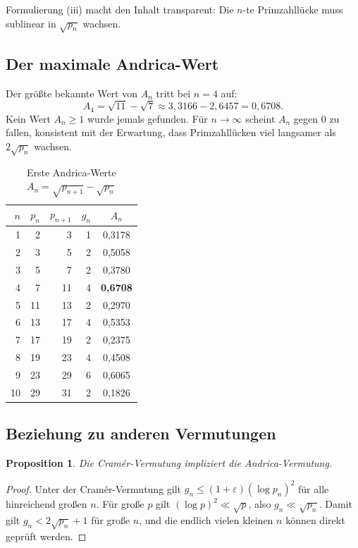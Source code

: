 \documentclass[12pt,a4paper]{amsart}
\newtheorem{proposition}[theorem]{Proposition}
\theoremstyle{definition}
\begin{document}
Formulierung (iii) macht den Inhalt transparent: Die $n$-te Primzahll\"{u}cke muss
sublinear in $\sqrt{p_n}$ wachsen.

\subsection{Der maximale Andrica-Wert}

Der gr\"{o}\ss{}te bekannte Wert von $A_n$ tritt bei $n = 4$ auf:
\[
  A_4 = \sqrt{11} - \sqrt{7} \approx 3{,}3166 - 2{,}6457 = 0{,}6708.
\]
Kein Wert $A_n \geq 1$ wurde jemals gefunden. F\"{u}r $n \to \infty$ scheint
$A_n$ gegen $0$ zu fallen, konsistent mit der Erwartung, dass Primzahll\"{u}cken
viel langsamer als $2\sqrt{p_n}$ wachsen.

\begin{table}[h]
\centering
\caption{Erste Andrica-Werte $A_n = \sqrt{p_{n+1}} - \sqrt{p_n}$}
\begin{tabular}{@{}rrrrc@{}}
\toprule
$n$ & $p_n$ & $p_{n+1}$ & $g_n$ & $A_n$ \\
\midrule
1 & 2 & 3 & 1 & 0{,}3178 \\
2 & 3 & 5 & 2 & 0{,}5058 \\
3 & 5 & 7 & 2 & 0{,}3780 \\
4 & 7 & 11 & 4 & \textbf{0{,}6708} \\
5 & 11 & 13 & 2 & 0{,}2970 \\
6 & 13 & 17 & 4 & 0{,}5353 \\
7 & 17 & 19 & 2 & 0{,}2375 \\
8 & 19 & 23 & 4 & 0{,}4508 \\
9 & 23 & 29 & 6 & 0{,}6065 \\
10 & 29 & 31 & 2 & 0{,}1826 \\
\bottomrule
\end{tabular}
\end{table}

\subsection{Beziehung zu anderen Vermutungen}

\begin{proposition}
Die Cram\'{e}r-Vermutung impliziert die Andrica-Vermutung.
\end{proposition}

\begin{proof}
Unter der Cram\'{e}r-Vermutung gilt $g_n \leq (1+\varepsilon)(\log p_n)^2$ f\"{u}r
alle hinreichend gro\ss{}en $n$. F\"{u}r gro\ss{}e $p$ gilt $(\log p)^2 \ll \sqrt{p}$,
also $g_n \ll \sqrt{p_n}$. Damit gilt $g_n < 2\sqrt{p_n} + 1$ f\"{u}r gro\ss{}e
$n$, und die endlich vielen kleinen $n$ k\"{o}nnen direkt gepr\"{u}ft werden.
\end{proof}
\end{document}
